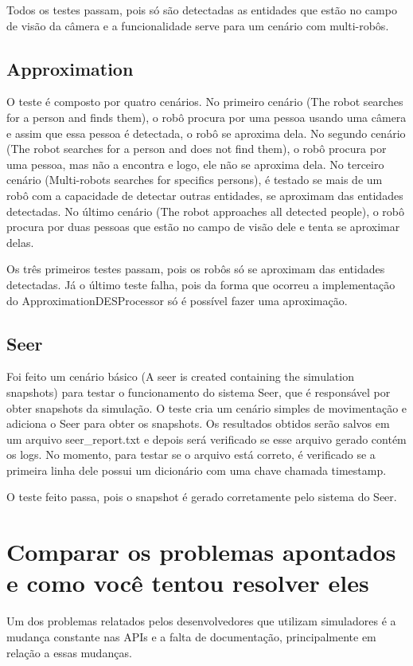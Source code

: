 Todos os testes passam, pois só são detectadas as entidades que estão no campo de visão da câmera e a funcionalidade serve para um cenário com multi-robôs.

\subsection{Approximation}
\label{sec:approximation}
O teste é composto por quatro cenários. No primeiro cenário (The robot searches for a person and finds them), o robô procura por uma pessoa usando uma câmera e assim que essa pessoa é detectada, o robô se aproxima dela. No segundo cenário (The robot searches for a person and does not find them), o robô procura por uma pessoa, mas não a encontra e logo, ele não se aproxima dela. No terceiro cenário (Multi-robots searches for specifics persons), é testado se mais de um robô com a capacidade de detectar outras entidades, se aproximam das entidades detectadas. No último cenário (The robot approaches all detected people), o robô procura por duas pessoas que estão no campo de visão dele e tenta se aproximar delas.

Os três primeiros testes passam, pois os robôs só se aproximam das entidades detectadas. Já o último teste falha, pois da forma que ocorreu a implementação do ApproximationDESProcessor só é possível fazer uma aproximação.

\subsection{Seer}
\label{sec:seer}
Foi feito um cenário básico (A seer is created containing the simulation snapshots) para testar o funcionamento do sistema Seer, que é responsável por obter snapshots da simulação. O teste cria um cenário simples de movimentação e adiciona o Seer para obter os snapshots. Os resultados obtidos serão salvos em um arquivo seer\_report.txt e depois será verificado se esse arquivo gerado contém os logs. No momento, para testar se o arquivo está correto, é verificado se a primeira linha dele possui um dicionário com uma chave chamada timestamp.

O teste feito passa,  pois o snapshot é gerado corretamente pelo sistema do Seer.

\section{Comparar os problemas apontados e como você tentou resolver eles}
\label{sec:problemasApontados}
Um dos problemas relatados pelos desenvolvedores que utilizam simuladores é a mudança constante nas APIs e a falta de documentação, principalmente em relação a essas mudanças.

